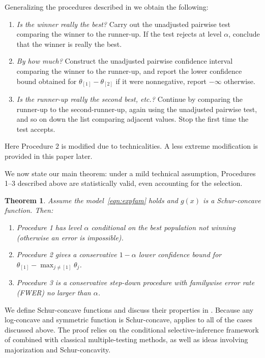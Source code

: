 \documentclass[11pt]{article}
\newtheorem{theorem}[corollary]{Theorem}
\begin{document}
Generalizing the procedures described in  we obtain the following:
\begin{enumerate}
\item {\em Is the winner really the best?} Carry out the unadjusted pairwise test comparing the winner to the runner-up. If the test rejects at level $\alpha$, conclude that the winner is really the best.
\item {\em By how much?} Construct the unadjusted pairwise confidence interval comparing the winner to the runner-up, and report the lower confidence bound obtained for $\theta_{[1]}-\theta_{[2]}$ if it were nonnegative, report $-\infty$ otherwise.
\item {\em Is the runner-up really the second best, etc.?} Continue by comparing the runner-up to the second-runner-up, again using the unadjusted pairwise test, and so on down the list comparing adjacent values. Stop the first time the test accepts.
\end{enumerate}
Here Procedure $2$ is modified due to technicalities. A less extreme modification is provided in this paper later.

We now state our main theorem: under a mild technical assumption, Procedures 1--3 described above are statistically valid, even accounting for the selection.
\begin{theorem}
Assume the model~\eqref{eqn:expfam} holds and $g\left(x\right)$ is a Schur-concave function. Then:
\begin{enumerate}
\item Procedure 1 has level $\alpha$ conditional on the best population not winning (otherwise an error is impossible).
\item Procedure 2 gives a conservative $1-\alpha$ lower confidence bound for $\theta_{[1]} - \max_{j \ne [1]} \theta_{j}$.
\item Procedure 3 is a conservative step-down procedure with familywise error rate (FWER) no larger than $\alpha$.
\end{enumerate}
\label{thm:main}
\end{theorem}

We define Schur-concave functions and discuss their properties in . Because any log-concave and symmetric function is Schur-concave,  applies to all of the cases discussed above. The proof relies on the conditional selective-inference framework of \citet{Fithian:2014ws} combined with classical multiple-testing methods, as well as ideas involving majorization and Schur-concavity.
\end{document}
